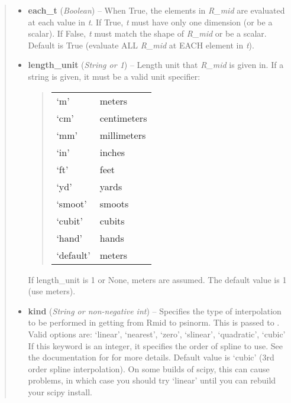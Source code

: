 \documentclass[letterpaper,10pt,english]{sphinxmanual}
\begin{document}
\begin{fulllineitems}
\begin{fulllineitems}
\begin{quote}
\begin{description}
\begin{itemize}
\item {} 
\textbf{each\_t} (\emph{Boolean}) --
When True, the elements in \emph{R\_mid} are evaluated
at each value in \emph{t}. If True, \emph{t} must have only one dimension
(or be a scalar). If False, \emph{t} must match the shape of \emph{R\_mid}
or be a scalar. Default is True (evaluate ALL \emph{R\_mid} at EACH
element in \emph{t}).

\item {} 
\textbf{length\_unit} (\emph{String or 1}) --
Length unit that \emph{R\_mid} is given in.
If a string is given, it must be a valid unit specifier:
\begin{quote}

\begin{tabulary}{\linewidth}{|L|L|}
\hline

`m'
 & 
meters
\\

`cm'
 & 
centimeters
\\

`mm'
 & 
millimeters
\\

`in'
 & 
inches
\\

`ft'
 & 
feet
\\

`yd'
 & 
yards
\\

`smoot'
 & 
smoots
\\

`cubit'
 & 
cubits
\\

`hand'
 & 
hands
\\

`default'
 & 
meters
\\
\hline\end{tabulary}

\end{quote}

If length\_unit is 1 or None, meters are assumed. The default
value is 1 (use meters).

\item {} 
\textbf{kind} (\emph{String or non-negative int}) --
Specifies the type of
interpolation to be performed in getting from Rmid to
psinorm. This is passed to
. Valid options are:
`linear', `nearest', `zero', `slinear', `quadratic', `cubic'
If this keyword is an integer, it specifies the order of spline
to use. See the documentation for  for more
details. Default value is `cubic' (3rd order spline
interpolation). On some builds of scipy, this can cause problems,
in which case you should try `linear' until you can rebuild your
scipy install.


\end{itemize}
\end{description}
\end{quote}
\end{fulllineitems}
\end{fulllineitems}
\end{document}
